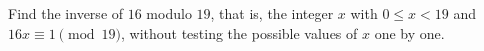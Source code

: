 Find the inverse of $16$ modulo $19$, that is, the integer $x$ with $0\le x<19$ and $16x\equiv1\pmod{19}$, without testing the possible values of $x$ one by one.
